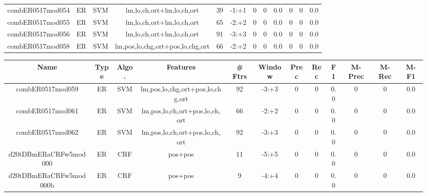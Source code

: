\documentclass[a4paper]{article}
\begin{document}
\begin{landscape}
\begin{center}
\begin{tabular}{ |c|c|c|c|c|c|c|c|c|c|c|c|}
 
 	
 	\small{ combER0517mod054 } & ER & SVM & lm,lo,ch,ort+lm,lo,ch,ort  &  39 &  -1:+1  &  0 & 0 & 0.0  &  0 & 0 & 0.0 \\
 	

 
 	
 	\small{ combER0517mod055 } & ER & SVM & lm,lo,ch,ort+lm,lo,ch,ort  &  65 &  -2:+2  &  0 & 0 & 0.0  &  0 & 0 & 0.0 \\
 	

 
 	
 	\small{ combER0517mod056 } & ER & SVM & lm,lo,ch,ort+lm,lo,ch,ort  &  91 &  -3:+3  &  0 & 0 & 0.0  &  0 & 0 & 0.0 \\
 	

 
 	
 	\small{ combER0517mod058 } & ER & SVM & lm,pos,lo,chg,ort+pos,lo,chg,ort  &  66 &  -2:+2  &  0 & 0 & 0.0  &  0 & 0 & 0.0 \\
 	
 \hline
\end{tabular}
\end{center}




\begin{center}
\begin{tabular}{ |c|c|c|c|c|c|c|c|c|c|c|c|} 
 \hline
 	Name & Type & Algo. & Features & \# Ftrs & Window & Prec & Rec & F1 & M-Prec & M-Rec & M-F1\\
 \hline

 	

 
 	
 	\small{ combER0517mod059 } & ER & SVM & lm,pos,lo,chg,ort+pos,lo,chg,ort  &  92 &  -3:+3  &  0 & 0 & 0.0  &  0 & 0 & 0.0 \\
 	

 
 	
 	\small{ combER0517mod061 } & ER & SVM & lm,pos,lo,ch,ort+pos,lo,ch,ort  &  66 &  -2:+2  &  0 & 0 & 0.0  &  0 & 0 & 0.0 \\
 	

 
 	
 	\small{ combER0517mod062 } & ER & SVM & lm,pos,lo,ch,ort+pos,lo,ch,ort  &  92 &  -3:+3  &  0 & 0 & 0.0  &  0 & 0 & 0.0 \\
 	

 
 	
 	\small{ d20tDBmERaCRFw5mod000 } & ER & CRF & pos+pos  &  11 &  -5:+5  &  0 & 0 & 0.0  &  0 & 0 & 0.0 \\
 	

 
 	
 	\small{ d20tDBmERaCRFw5mod000b } & ER & CRF & pos+pos  &  9 &  -4:+4  &  0 & 0 & 0.0  &  0 & 0 & 0.0 \\
 	


\end{tabular}
\end{center}
\end{landscape}
\end{document}
